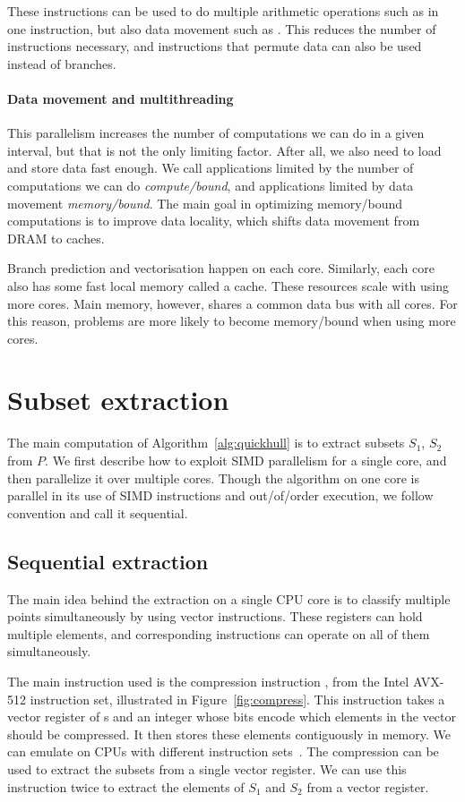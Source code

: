 These instructions can be used to do multiple arithmetic operations such as  in one instruction, but also data movement such as .
This reduces the number of instructions necessary, and instructions that permute data can also be used instead of branches.

\paragraph{Data movement and multithreading}
This parallelism increases the number of computations we can do in a given interval, but that is not the only limiting factor.
After all, we also need to load and store data fast enough.
We call applications limited by the number of computations we can do \emph{compute\-/bound}, and applications limited by data movement \emph{memory\-/bound}.
The main goal in optimizing memory\-/bound computations is to improve data locality, which shifts data movement from DRAM to caches.

Branch prediction and vectorisation happen on each core.
Similarly, each core also has some fast local memory called a cache.
These resources scale with using more cores.
Main memory, however, shares a common data bus with all cores.
For this reason, problems are more likely to become memory\-/bound when using more cores.

\section{Subset extraction}\label{sec:subset}
The main computation of Algorithm~\ref{alg:quickhull} is to extract subsets $S_1$, $S_2$ from $P$.
We first describe how to exploit SIMD parallelism for a single core, and then parallelize it over multiple cores.
Though the algorithm on one core is parallel in its use of SIMD instructions and out\-/of\-/order execution, we follow convention and call it sequential.

\subsection{Sequential extraction}
The main idea behind the extraction on a single CPU core is to classify multiple points simultaneously by using vector instructions.
These registers can hold multiple elements, and corresponding instructions can operate on all of them simultaneously.

The main instruction used is the compression instruction , from the Intel AVX-512 instruction set, illustrated in Figure~\ref{fig:compress}.
This instruction takes a vector register of s and an integer whose bits encode which elements in the vector should be compressed.
It then stores these elements contiguously in memory.
We can emulate  on CPUs with different instruction sets~\cite{wassenberg2022vectorized}.
The compression can be used to extract the subsets from a single vector register.
We can use this instruction twice to extract the elements of $S_1$ and $S_2$ from a vector register.

